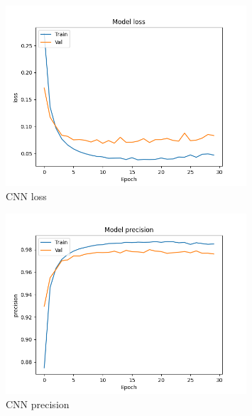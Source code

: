 \documentclass{article}
\begin{document}
    \begin{figure}[H]
        \centering
        \includegraphics[width=0.8\textwidth]{report_img/nn_results/string_embedding_cnn_26/metric_loss}
        \caption{CNN loss}
        \label{fig:}
    \end{figure}

    \begin{figure}[H]
        \centering
        \includegraphics[width=0.8\textwidth]{report_img/nn_results/string_embedding_cnn_26/metric_precision}
        \caption{CNN precision}
        \label{fig:}
    \end{figure}
\end{document}
